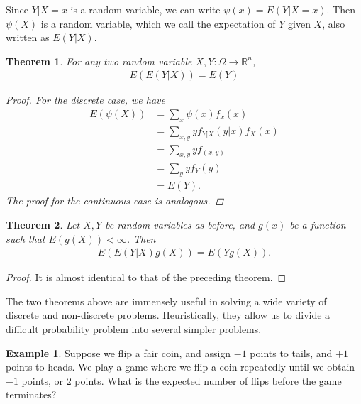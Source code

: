 \documentclass[12pt]{article}
\newcommand{\rr}{\mathbb{R}}
\theoremstyle{plain}
\newtheorem{theorem}{Theorem}
\theoremstyle{definition}
\newtheorem*{example}{Example}
\theoremstyle{remark}
\numberwithin{equation}{section}  %
\begin{document}
Since $Y|X =x$ is a random variable, we can write $\psi(x) = E(Y | X =x)$.
Then $\psi(X)$ is a random variable, which we call the expectation of $Y$ given
$X$, also written as $E(Y|X)$.
\begin{theorem}
    For any two random variable $X,Y: \Omega \to \rr^n$,
    \begin{align*}
        E(E(Y | X)) = E(Y)
    \end{align*}
    \begin{proof}
        For the discrete case, we have
        \begin{align*}
            E(\psi(X)) 
            & = \sum_{x} \psi(x) f_x(x)
            \\
            & = \sum_{x,y} y f_{Y|X}(y|x) f_X(x)
            \\
            & = \sum_{x,y} y f_{(x,y)}
            \\
            & = \sum_y y f_Y(y)
            \\
            & = E(Y).
        \end{align*}
        The proof for the continuous case is analogous. 
    \end{proof}
\end{theorem}
\begin{theorem}
    Let $X,Y$ be random variables as before, and $g(x)$ be a function such that
    $E(g(X))< \infty$. Then
    \begin{align*}
        E(E(Y|X)g(X)) = E(Yg(X)).
    \end{align*}
\end{theorem}
\begin{proof}
    It is almost identical to that of the preceding theorem.
\end{proof}
The two theorems above are immensely useful in solving a wide variety of
discrete and non-discrete problems. Heuristically, they allow us to divide a
difficult probability problem into several simpler problems.

\begin{example}
    Suppose we flip a fair coin, and assign $-1$ points to tails, and $+1$ points to
    heads. We play a game where we flip a coin repeatedly until we obtain
    $-1$ points, or $2$ points. What is the expected number of flips before the
    game terminates? 
\end{example}
\end{document}
